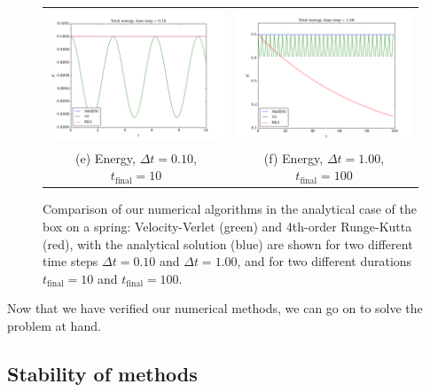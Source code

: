 \documentclass{article}
\begin{document}
\begin{multicols}{2}
\begin{figure}
\begin{center}
\begin{tabular}{cc}
  	\includegraphics[width=90mm]{Images/comparison_E_01.png}
	& \includegraphics[width=90mm]{Images/comparison_E_1.png} \\
	(e) Energy, $\Delta t = 0.10$, $t_{\mathrm{final}} = 10$				& (f) Energy, $\Delta t = 1.00$, $t_{\mathrm{final}} = 100$  \\[6pt]
\end{tabular}
\caption{Comparison of our numerical algorithms in the analytical case of the box on a spring: Velocity-Verlet (green) and 4th-order Runge-Kutta (red), with the analytical solution (blue) are shown for two different time steps $\Delta t = 0.10$ and $\Delta t = 1.00$, and for two different durations $t_{\mathrm{final}} = 10$ and $t_{\mathrm{final}} = 100$.}\label{fig:analytical}
\end{center}
\end{figure}


\noindent Now that we have verified our numerical methods, we can go on to solve the problem at hand.



\subsection{Stability of methods}


\end{multicols}
\end{document}
